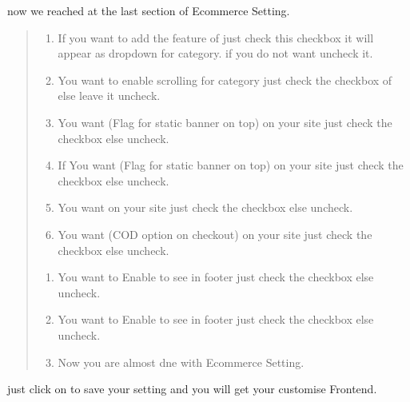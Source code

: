 \documentclass[a4paper,10pt,english]{report}
\begin{document}
now we reached at the last section of Ecommerce Setting.
\begin{quote}
\begin{enumerate}
\def\theenumi{\arabic{enumi}}
\def\labelenumi{\theenumi .}
\makeatletter\def\p@enumii{\p@enumi \theenumi .}\makeatother
\setcounter{enumi}{40}
\item {} 
If you want to add the feature of  just check this checkbox it will appear as dropdown for category. if you do not want uncheck it.

\item {} 
You want to enable scrolling for category just check the checkbox of  else leave it uncheck.

\item {} 
You want  (Flag for static banner on top) on your site just check the checkbox else uncheck.

\item {} 
If You want  (Flag for static banner on top) on your site just check the checkbox else uncheck.

\item {} 
You want  on your site just check the checkbox else uncheck.

\item {} 
You want  (COD option on checkout) on your site just check the checkbox else uncheck.

\end{enumerate}
\begin{enumerate}
\def\theenumi{\arabic{enumi}}
\def\labelenumi{\theenumi .}
\makeatletter\def\p@enumii{\p@enumi \theenumi .}\makeatother
\setcounter{enumi}{47}
\item {} 
You want to Enable to see  in footer just check the checkbox else uncheck.

\item {} 
You want to Enable to see  in footer just check the checkbox else uncheck.

\item {} 
Now you are almost dne with Ecommerce Setting.

\end{enumerate}
\end{quote}

just click on  to save your setting and you will get your customise Frontend.
\end{document}
